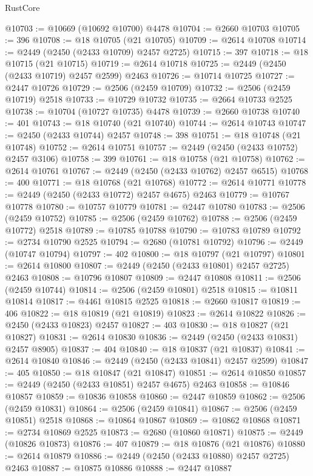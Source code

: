 \begin{lexlean}{RustCore}
\begin{coremodule}
@10703 := @10669 (@10692 @10700) @4478
@10704 := @2660 @10703
@10705 := 396
@10708 := @18 @10705 (@21 @10705)
@10709 := @2614 @10708
@10714 := @2449 (@2450 (@2433 @10709) @2457 @2725)
@10715 := 397
@10718 := @18 @10715 (@21 @10715)
@10719 := @2614 @10718
@10725 := @2449 (@2450 (@2433 @10719) @2457 @2599) @2463
@10726 := @10714 @10725
@10727 := @2447 @10726
@10729 := @2506 (@2459 @10709)
@10732 := @2506 (@2459 @10719) @2518
@10733 := @10729 @10732
@10735 := @2664 @10733 @2525
@10738 := @10704 (@10727 @10735) @4478
@10739 := @2660 @10738
@10740 := 401
@10743 := @18 @10740 (@21 @10740)
@10744 := @2614 @10743
@10747 := @2450 (@2433 @10744) @2457
@10748 := 398
@10751 := @18 @10748 (@21 @10748)
@10752 := @2614 @10751
@10757 := @2449 (@2450 (@2433 @10752) @2457 @3106)
@10758 := 399
@10761 := @18 @10758 (@21 @10758)
@10762 := @2614 @10761
@10767 := @2449 (@2450 (@2433 @10762) @2457 @6515)
@10768 := 400
@10771 := @18 @10768 (@21 @10768)
@10772 := @2614 @10771
@10778 := @2449 (@2450 (@2433 @10772) @2457 @4675) @2463
@10779 := @10767 @10778
@10780 := @10757 @10779
@10781 := @2447 @10780
@10783 := @2506 (@2459 @10752)
@10785 := @2506 (@2459 @10762)
@10788 := @2506 (@2459 @10772) @2518
@10789 := @10785 @10788
@10790 := @10783 @10789
@10792 := @2734 @10790 @2525
@10794 := @2680 (@10781 @10792)
@10796 := @2449 (@10747 @10794)
@10797 := 402
@10800 := @18 @10797 (@21 @10797)
@10801 := @2614 @10800
@10807 := @2449 (@2450 (@2433 @10801) @2457 @2725) @2463
@10808 := @10796 @10807
@10809 := @2447 @10808
@10811 := @2506 (@2459 @10744)
@10814 := @2506 (@2459 @10801) @2518
@10815 := @10811 @10814
@10817 := @4461 @10815 @2525
@10818 := @2660 @10817
@10819 := 406
@10822 := @18 @10819 (@21 @10819)
@10823 := @2614 @10822
@10826 := @2450 (@2433 @10823) @2457
@10827 := 403
@10830 := @18 @10827 (@21 @10827)
@10831 := @2614 @10830
@10836 := @2449 (@2450 (@2433 @10831) @2457 @8905)
@10837 := 404
@10840 := @18 @10837 (@21 @10837)
@10841 := @2614 @10840
@10846 := @2449 (@2450 (@2433 @10841) @2457 @2599)
@10847 := 405
@10850 := @18 @10847 (@21 @10847)
@10851 := @2614 @10850
@10857 := @2449 (@2450 (@2433 @10851) @2457 @4675) @2463
@10858 := @10846 @10857
@10859 := @10836 @10858
@10860 := @2447 @10859
@10862 := @2506 (@2459 @10831)
@10864 := @2506 (@2459 @10841)
@10867 := @2506 (@2459 @10851) @2518
@10868 := @10864 @10867
@10869 := @10862 @10868
@10871 := @2734 @10869 @2525
@10873 := @2680 (@10860 @10871)
@10875 := @2449 (@10826 @10873)
@10876 := 407
@10879 := @18 @10876 (@21 @10876)
@10880 := @2614 @10879
@10886 := @2449 (@2450 (@2433 @10880) @2457 @2725) @2463
@10887 := @10875 @10886
@10888 := @2447 @10887

\end{coremodule}
\end{lexlean}
